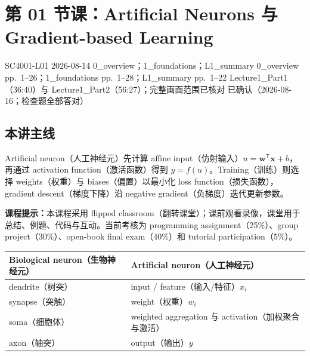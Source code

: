 
\section{第 01 节课：Artificial Neurons 与 Gradient-based Learning}
\label{lecture:SC4001-L01}

\lecturemeta
  {SC4001-L01}
  {2026-08-14}
  {0\_overview；1\_foundations；L1\_summary}
  {0\_overview pp.~1--26；1\_foundations pp.~1--28；L1\_summary pp.~1--22}
  {Lecture1\_Part1（36:40）与 Lecture1\_Part2（56:27）；完整画面范围已核对}
  {已确认（2026-08-16；检查题全部答对）}

\subsection{本讲主线}

Artificial neuron（人工神经元）先计算 affine input（仿射输入）$u=\bm w^{\mathsf T}\bm x+b$，再通过 activation function（激活函数）得到 $y=f(u)$。Training（训练）则选择 weights（权重）与 biases（偏置）以最小化 loss function（损失函数），gradient descent（梯度下降）沿 negative gradient（负梯度）迭代更新参数。

\textbf{课程提示：}本课程采用 flipped classroom（翻转课堂）；课前观看录像，课堂用于总结、例题、代码与互动。当前考核为 programming assignment（25\%）、group project（30\%）、open-book final exam（40\%）和 tutorial participation（5\%）。



\begin{center}
\small
\begin{tabularx}{0.9\textwidth}{@{}>{\raggedright\arraybackslash}p{3.4cm}X@{}}
  \toprule
  Biological neuron（生物神经元） & Artificial neuron（人工神经元） \\
  \midrule
  dendrite（树突） & input / feature（输入/特征）$x_i$ \\
  synapse（突触） & weight（权重）$w_i$ \\
  soma（细胞体） & weighted aggregation 与 activation（加权聚合与激活） \\
  axon（轴突） & output（输出）$y$ \\
  \bottomrule
\end{tabularx}
\end{center}

